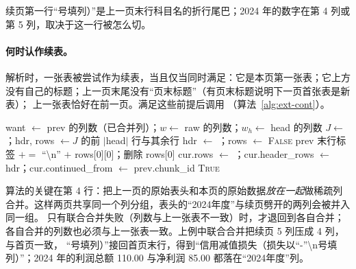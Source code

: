 续页第一行“号填列）”是上一页末行科目名的折行尾巴；2024 年的数字在第 4 列或第 5 列，取决于这一行被怎么切。

\paragraph{何时认作续表。}
解析时，一张表被尝试作为续表，当且仅当同时满足：它是本页第一张表；它上方没有自己的标题；上一页末尾没有“页末标题”（有页末标题说明下一页首张表是新表）；
上一张表恰好在前一页。满足这些前提后调用 （算法~\ref{alg:ext-cont}）。

\begin{algorithm}[t]
\caption{续表链接 }
\label{alg:ext-cont}
\begin{algorithmic}[1]
  \State want $\gets$ prev 的列数（已合并列）；$w\gets$ raw 的列数；$w_h\gets$ head 的列数 
    \State $J\gets$ ；hdr, rows $\gets J$ 的前 $|$head$|$ 行与其余行
  \EndIf
    \State hdr $\gets$ ；rows $\gets$  
     \Return \textsc{False}  \EndIf
  \EndIf
    \State prev 末行标签 $\mathrel{+}=$ ``\textbackslash n'' $+$ rows[0][0]；删除 rows[0]
  \EndWhile
  \State cur.rows $\gets$ ；cur.header\_rows $\gets$ hdr；cur.continued\_from $\gets$ prev.chunk\_id
  \State \Return \textsc{True}
\EndFunction
\end{algorithmic}
\end{algorithm}

算法的关键在第 4 行：把上一页的原始表头和本页的原始数据\emph{放在一起}做稀疏列合并。这样两页共享同一个列分组，表头的“2024年度”与续页劈开的两列会被并入同一组。
只有联合合并失败（列数与上一张表不一致）时，才退回到各自合并；各自合并的列数也必须与上一张表一致。上例中联合合并把续页 5 列压成 4 列，与首页一致，
“号填列）”接回首页末行，得到“信用减值损失（损失以“-”\textbackslash n号填列）”；2024 年的利润总额 110.00 与净利润 85.00 都落在“2024年度”列。

